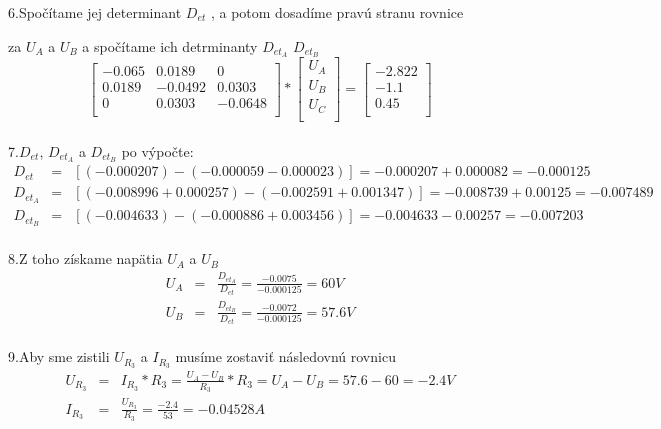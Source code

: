 \documentclass[a4paper,oneside,12pt]{article}
\begin{document}
6.Spočítame jej determinant $D_{et}$ , a potom dosadíme pravú stranu rovnice 

za $U_{A}$ a $U_{B}$ a spočítame ich detrminanty $D_{et_{A}}$ $D_{et_{B}}$\\
\[
\begin{bmatrix}
    -0.065 & 0.0189 & 0 \\
    0.0189 & -0.0492 & 0.0303 \\
   	0 & 0.0303 & -0.0648 \\
\end{bmatrix}
*
\begin{bmatrix}
	U_{A} \\
	U_{B} \\
	U_{C} \\
\end{bmatrix}
=
\begin{bmatrix}
	-2.822 \\
	-1.1 \\
	0.45 \\
\end{bmatrix}
\]\\

7.$D_{et}$, $D_{et_{A}}$ a $D_{et_{B}}$ po výpočte: 
\begin{eqnarray*}
	D_{et} &= & [(-0.000207) - (-0.000059 - 0.000023)] = -0.000207 + 0.000082 = -0.000125 \\
	D_{et_{A}} &= & [(-0.008996 + 0.000257) - (-0.002591 + 0.001347)] = -0.008739 + 0.00125 = -0.007489 \\
	D_{et_{B}} &= & [(-0.004633) - (-0.000886 + 0.003456)] = -0.004633 - 0.00257 = -0.007203 \\
\end{eqnarray*}

8.Z toho získame napätia $U_{A}$ a $U_{B}$
\begin{eqnarray*}
	U_{A} &= & \frac{D_{et_{A}}}{D_{et}} = \frac{-0.0075}{-0.000125} = 60 V\\
	U_{B} &= & \frac{D_{et_{B}}}{D_{et}} = \frac{-0.0072}{-0.000125} = 57.6 V\\
\end{eqnarray*}

9.Aby sme zistili $U_{R_{3}}$ a $I_{R_{3}}$ musíme zostaviť následovnú rovnicu
\begin{eqnarray*}
	U_{R_{3}} &= & I_{R_{3}} * R_{3} = \frac{U_{A} - U_{B}}{R_{3}} * R_{3} = U_{A} - U_{B} = 57.6 - 60 = -2.4 V\\
	I_{R_{3}} &= & \frac{U_{R_{3}}}{R_{3}} = \frac{-2.4}{53} = -0.04528 A\\ 
\end{eqnarray*}
 
\end{document}
